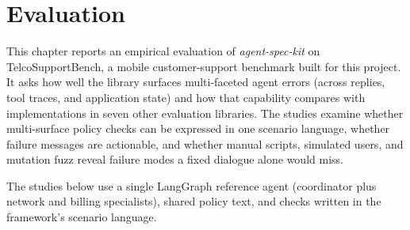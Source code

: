 \chapter{Evaluation}
\label{chap:evaluation}

This chapter reports an empirical evaluation of \emph{agent-spec-kit} on TelcoSupportBench, a mobile customer-support benchmark built for this project. It asks how well the library surfaces multi-faceted agent errors (across replies, tool traces, and application state) and how that capability compares with implementations in seven other evaluation libraries. The studies examine whether multi-surface policy checks can be expressed in one scenario language, whether failure messages are actionable, and whether manual scripts, simulated users, and mutation fuzz reveal failure modes a fixed dialogue alone would miss.

The studies below use a single LangGraph reference agent (coordinator plus network and billing specialists), shared policy text, and checks written in the framework's scenario language.






